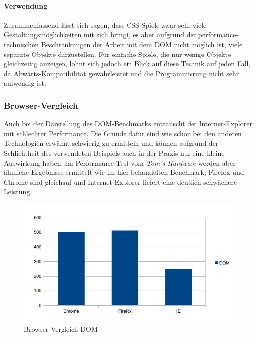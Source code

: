 \documentclass[a4paper, 12pt]{article}
\begin{document}
\paragraph{Verwendung} Zusammenfassend lässt sich sagen, dass CSS-Spiele zwar sehr viele Gestaltungsmöglichkeiten mit sich bringt, es aber aufgrund der performance-technischen Beschränkungen der Arbeit mit dem DOM nicht möglich ist, viele separate Objekte darzustellen. Für einfache Spiele, die nur wenige Objekte gleichzeitig anzeigen, lohnt sich jedoch ein Blick auf diese Technik auf jeden Fall, da Abwärts-Kompatibilität gewährleistet und die Programmierung nicht sehr aufwendig ist.
\subsubsection{Browser-Vergleich} Auch bei der Darstellung des DOM-Benchmarks enttäuscht der Internet-Explorer mit schlechter Performance. Die Gründe dafür sind wie schon bei den anderen Technologien erwähnt schwierig zu ermitteln und können aufgrund der Schlichtheit des verwendeten Beispiels auch in der Praxis nur eine kleine Auswirkung haben. Im Performance-Test vom \emph{Tom's Hardware} werden aber ähnliche Ergebnisse ermittelt wie im hier behandelten Benchmark; Firefox und Chrome sind gleichauf und Internet Explorer liefert eine deutlich schwächere Leistung.
\begin{figure}[H]
	\includegraphics[width=\textwidth]{assets/browser_comp_dom} 
	\caption{Browser-Vergleich DOM}
	\label{browser_comp_dom}
\end{figure}
\newpage
\end{document}
